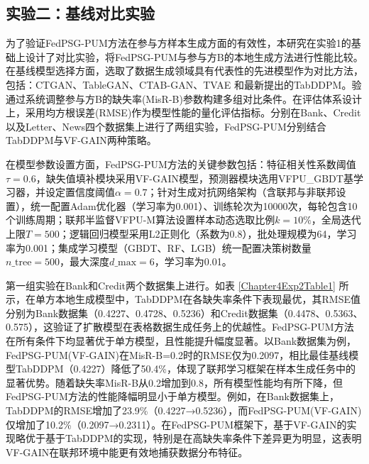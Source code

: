 \subsection{实验二：基线对比实验}
为了验证FedPSG-PUM方法在参与方样本生成方面的有效性，本研究在实验1的基础上设计了对比实验，将FedPSG-PUM与参与方B的本地生成方法进行性能比较。在基线模型选择方面，选取了数据生成领域具有代表性的先进模型作为对比方法，包括：CTGAN、TableGAN、CTAB-GAN、TVAE 和最新提出的TabDDPM。验通过系统调整参与方B的缺失率(MisR-B)参数构建多组对比条件。在评估体系设计上，采用均方根误差(RMSE)作为模型性能的量化评估指标。分别在Bank、Credit以及Letter、News四个数据集上进行了两组实验，FedPSG-PUM分别结合TabDDPM与VF-GAIN两种策略。

在模型参数设置方面，FedPSG-PUM方法的关键参数包括：特征相关性系数阈值$\tau=0.6$，缺失值填补模块采用VF-GAIN模型，预测器模块选用VFPU\_GBDT基学习器，并设定置信度阈值$\alpha=0.7$；针对生成对抗网络架构（含联邦与非联邦设置），统一配置Adam优化器（学习率为0.001）、训练轮次为10000次，每轮包含10个训练周期；联邦半监督VFPU-M算法设置样本动态选取比例$k=10\%$，全局迭代上限$T=500$；逻辑回归模型采用L2正则化（系数为0.8），批处理规模为64，学习率为0.001；集成学习模型（GBDT、RF、LGB）统一配置决策树数量$n\_{\text{tree}}=500$，最大深度$d\_{\text{max}}=6$，学习率为0.01。

第一组实验在Bank和Credit两个数据集上进行。如表 \ref{Chapter4Exp2Table1} 所示，在单方本地生成模型中，TabDDPM在各缺失率条件下表现最优，其RMSE值分别为Bank数据集（0.4227、0.4728、0.5236）和Credit数据集（0.4478、0.5363、0.575），这验证了扩散模型在表格数据生成任务上的优越性。FedPSG-PUM方法在所有条件下均显著优于单方模型，且性能提升幅度显著。以Bank数据集为例，FedPSG-PUM(VF-GAIN)在MisR-B=0.2时的RMSE仅为0.2097，相比最佳基线模型TabDDPM（0.4227）降低了50.4\%，体现了联邦学习框架在样本生成任务中的显著优势。随着缺失率MisR-B从0.2增加到0.8，所有模型性能均有所下降，但FedPSG-PUM方法的性能降幅明显小于单方模型。例如，在Bank数据集上，TabDDPM的RMSE增加了23.9\%（0.4227→0.5236），而FedPSG-PUM(VF-GAIN)仅增加了10.2\%（0.2097→0.2311）。在FedPSG-PUM框架下，基于VF-GAIN的实现略优于基于TabDDPM的实现，特别是在高缺失率条件下差异更为明显，这表明VF-GAIN在联邦环境中能更有效地捕获数据分布特征。

